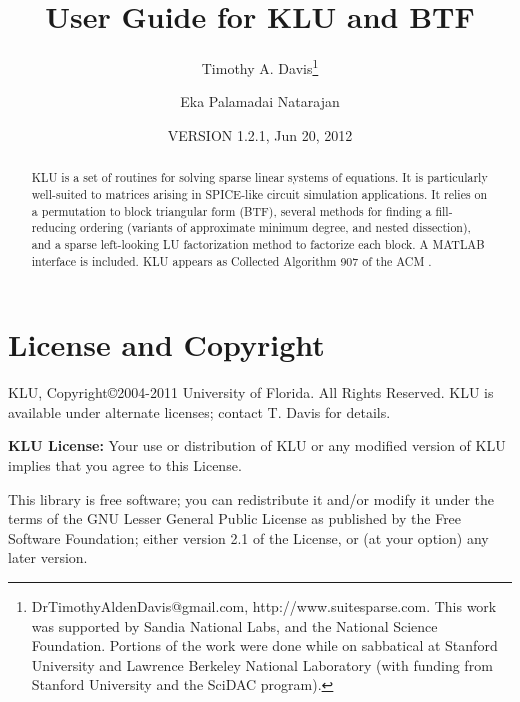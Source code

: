 \documentclass[11pt]{article}
\begin{document}

\title{User Guide for KLU and BTF}
\author{
Timothy A. Davis\thanks{
DrTimothyAldenDavis@gmail.com,
http://www.suitesparse.com.
This work was supported by Sandia National Labs, and the National
Science Foundation.
Portions of the work were done while on sabbatical at Stanford University
and Lawrence Berkeley National Laboratory (with funding from Stanford
University and the SciDAC program).
}
\and Eka Palamadai Natarajan}

\date{VERSION 1.2.1, Jun 20, 2012}
\maketitle

\begin{abstract}
KLU is a set of routines for solving sparse linear systems of equations.
It is particularly well-suited to matrices arising in SPICE-like circuit
simulation applications.
It relies on a permutation to block triangular form (BTF), several methods
for finding a fill-reducing ordering (variants of approximate minimum degree,
and nested dissection), and a sparse left-looking LU factorization method
to factorize each block.  A MATLAB interface is included.
KLU appears as Collected Algorithm 907 of the ACM \cite{DavisNatarajan10}.
\end{abstract}

\newpage
\tableofcontents
\newpage

\section{License and Copyright}

KLU, Copyright\copyright 2004-2011 University of Florida.
All Rights Reserved.
KLU is available under alternate licenses; contact T. Davis for details.

{\bf KLU License:}
    Your use or distribution of KLU or any modified version of
    KLU implies that you agree to this License.

    This library is free software; you can redistribute it and/or
    modify it under the terms of the GNU Lesser General Public
    License as published by the Free Software Foundation; either
    version 2.1 of the License, or (at your option) any later version.
\end{document}
